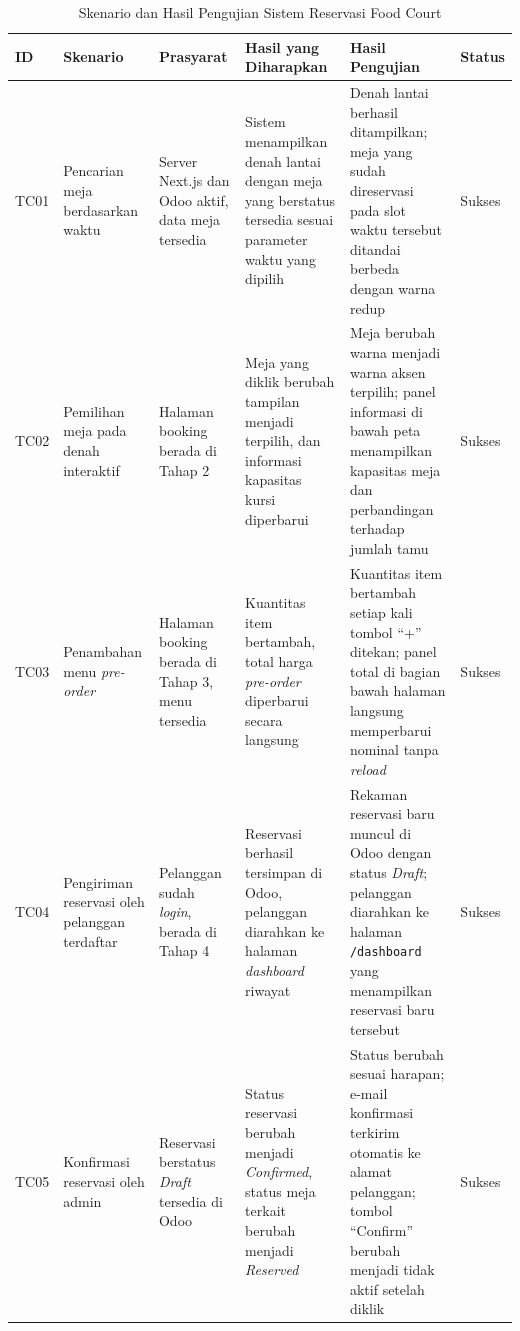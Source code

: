 \documentclass[conference]{IEEEtran}
\begin{document}
\begin{table}[htbp]
\caption{Skenario dan Hasil Pengujian Sistem Reservasi Food Court}
\label{tab:test_scenarios}
\centering
\footnotesize
\begin{tabularx}{\textwidth}{|
>{\centering\arraybackslash}p{0.7cm}|
>{\raggedright\arraybackslash}p{2.4cm}|
>{\raggedright\arraybackslash}p{2.5cm}|
>{\raggedright\arraybackslash}X|
>{\raggedright\arraybackslash}X|
>{\centering\arraybackslash}p{1.2cm}|}
\hline
\textbf{ID} & \textbf{Skenario} & \textbf{Prasyarat} & \textbf{Hasil yang Diharapkan} & \textbf{Hasil Pengujian} & \textbf{Status} \\
\hline
TC01 & Pencarian meja berdasarkan waktu & Server Next.js dan Odoo aktif, data meja tersedia & Sistem menampilkan denah lantai dengan meja yang berstatus tersedia sesuai parameter waktu yang dipilih & Denah lantai berhasil ditampilkan; meja yang sudah direservasi pada slot waktu tersebut ditandai berbeda dengan warna redup & Sukses \\
\hline
TC02 & Pemilihan meja pada denah interaktif & Halaman booking berada di Tahap 2 & Meja yang diklik berubah tampilan menjadi terpilih, dan informasi kapasitas kursi diperbarui & Meja berubah warna menjadi warna aksen terpilih; panel informasi di bawah peta menampilkan kapasitas meja dan perbandingan terhadap jumlah tamu & Sukses \\
\hline
TC03 & Penambahan menu \textit{pre-order} & Halaman booking berada di Tahap 3, menu tersedia & Kuantitas item bertambah, total harga \textit{pre-order} diperbarui secara langsung & Kuantitas item bertambah setiap kali tombol ``+'' ditekan; panel total di bagian bawah halaman langsung memperbarui nominal tanpa \textit{reload} & Sukses \\
\hline
TC04 & Pengiriman reservasi oleh pelanggan terdaftar & Pelanggan sudah \textit{login}, berada di Tahap 4 & Reservasi berhasil tersimpan di Odoo, pelanggan diarahkan ke halaman \textit{dashboard} riwayat & Rekaman reservasi baru muncul di Odoo dengan status \textit{Draft}; pelanggan diarahkan ke halaman \texttt{/dashboard} yang menampilkan reservasi baru tersebut & Sukses \\
\hline
TC05 & Konfirmasi reservasi oleh admin & Reservasi berstatus \textit{Draft} tersedia di Odoo & Status reservasi berubah menjadi \textit{Confirmed}, status meja terkait berubah menjadi \textit{Reserved} & Status berubah sesuai harapan; e-mail konfirmasi terkirim otomatis ke alamat pelanggan; tombol ``Confirm'' berubah menjadi tidak aktif setelah diklik & Sukses \\

\end{tabularx}
\end{table}
\end{document}
